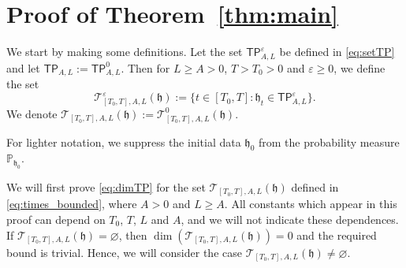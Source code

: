 \documentclass[oneside,final,11pt]{amsart}
\newtheorem{prop}[thm]{Proposition}
\theoremstyle{definition}
\newcounter{assum}
\newcommand{\fh}{\mathfrak{h}}
\newcommand{\TTP}{\mathsf{TP}}
\newcommand{\CT}{\mathcal{T}}
\newcommand{\1}[1]{\mathbf{1}_{#1}}
\newcommand{\eps}{\varepsilon}
\newcommand{\kmtext}[1]{{\color{red}[KM:#1]}}
\renewcommand{\P}{\mathbb P}
\let\emptyset\varnothing
\numberwithin{equation}{section}
\begin{document}

\section{Proof of Theorem~\ref{thm:main}}
\label{sec:main_proof}



We start by making some definitions. Let the set $\TTP_{\!A, L}^{\eps}$ be defined in \eqref{eq:setTP} and let $\TTP_{\!A, L} := \TTP_{\!A, L}^{0}$. Then for $L \geq A > 0$, $T > T_0 > 0$ and $\eps \geq 0$, we define the set
\begin{equation}\label{eq:times_bounded}
\CT_{[T_0, T], A, L}^{\eps}(\fh) := \bigl\{t \in [T_0,T] : \fh_t \in \TTP_{\!A, L}^{\eps}\bigr\}.
\end{equation}
We denote $\CT_{[T_0, T], A, L}(\fh) := \CT^{0}_{[T_0, T], A, L}(\fh)$. 


%
For lighter notation, we suppress the initial data $\fh_0$ from the probability measure $\P_{\fh_0}$.

We will first prove \eqref{eq:dimTP} for the set $\CT_{[T_0, T], A, L}(\fh)$ defined in \eqref{eq:times_bounded}, where $A > 0$ and $L \geq A$. All constants which appear in this proof can depend on $T_0$, $T$, $L$ and $A$, and we will not indicate these dependences. If $\CT_{[T_0, T], A, L}(\fh) = \emptyset$, then $\dim(\CT_{[T_0, T], A, L}(\fh)) = 0$ and the required bound is trivial. Hence, we will consider the case $\CT_{[T_0, T], A, L}(\fh) \neq \emptyset$.
\medskip
\end{document}

